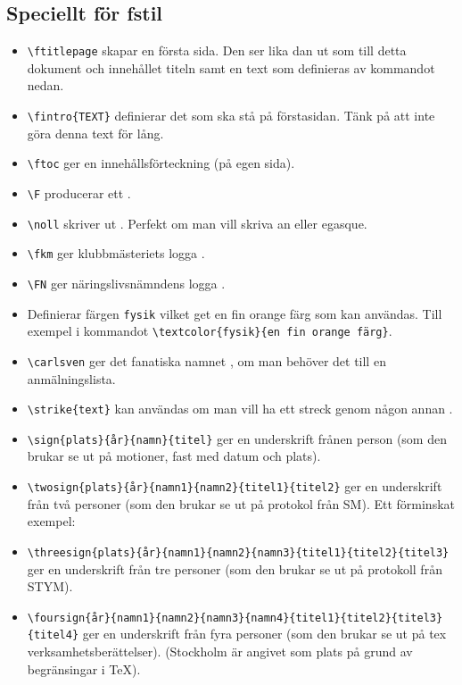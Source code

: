 \documentclass[a4paper]{article}
\newcommand{\bs}{\textbackslash}
\begin{document}
\subsection{Speciellt för fstil}
\begin{itemize}
\item \texttt{\bs ftitlepage} skapar en första sida. Den ser lika dan ut som till detta dokument och innehållet titeln samt en text som definieras av kommandot nedan.
\item \texttt{\bs fintro\{TEXT\}} definierar det som ska stå på förstasidan. Tänk på att inte göra denna text för lång.
\item \texttt{\bs ftoc} ger en innehållsförteckning (på egen sida).
\item \texttt{\bs F} producerar ett \F.
\item \texttt{\bs noll} skriver ut \noll. Perfekt om man vill skriva \noll an eller \noll egasque.
\item \texttt{\bs fkm} ger klubbmästeriets logga \fkm.
\item \texttt{\bs FN} ger näringslivsnämndens logga \FN.
\item Definierar färgen \texttt{fysik} vilket get \textcolor{fysik}{en fin orange färg} som kan användas. Till exempel i kommandot \texttt{\bs textcolor\{fysik\}\{en fin orange färg\}}.
\item \texttt{\bs carlsven} ger det fanatiska namnet \carlsven, om man behöver det till en anmälningslista.
\item \texttt{\bs strike\{text\}} kan användas om man vill ha ett streck genom någon annan .
\item \texttt{\bs sign\{plats\}\{år\}\{namn\}\{titel\}} ger en underskrift frånen person (som den brukar se ut på motioner, fast med datum och plats).
\item \texttt{\bs twosign\{plats\}\{år\}\{namn1\}\{namn2\}\{titel1\}\{titel2\}} ger en underskrift från två personer (som den brukar se ut på protokol från SM). Ett förminskat exempel: {\footnotesize
{}
}
\item \texttt{\bs threesign\{plats\}\{år\}\{namn1\}\{namn2\}\{namn3\}\{titel1\}\{titel2\}\{titel3\}} ger en underskrift från tre personer (som den brukar se ut på protokoll från STYM).
\item \texttt{\bs foursign\{år\}\{namn1\}\{namn2\}\{namn3\}\{namn4\}\{titel1\}\{titel2\}\{titel3\}\{titel4\}} ger en underskrift från fyra personer (som den brukar se ut på tex verksamhetsberättelser). (Stockholm är angivet som plats på grund av begränsingar i \TeX).
\end{itemize}
\end{document}

